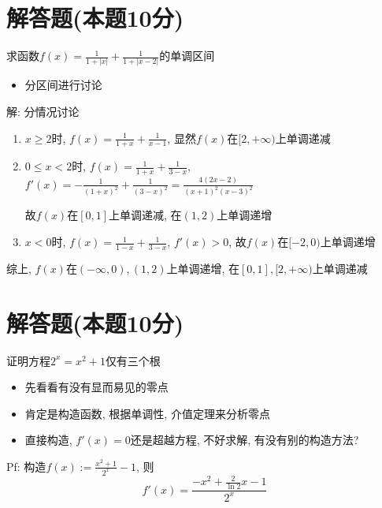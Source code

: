 \documentclass[10pt]{SelfArx} %
\numberwithin{dummy}{section}
\newenvironment{corollary}{\begin{cBox}\noindent{\bf\color{color1} 分析}}{\end{cBox}}
\begin{document}
\section[解答题]{解答题(本题10分)}
求函数$f(x)=\displaystyle\frac{1}{1+|x|}+\displaystyle\frac{1}{1+|x-2|}$的单调区间
\begin{corollary}
	\begin{itemize}
		\item 分区间进行讨论
	\end{itemize}
\end{corollary}
解: 分情况讨论
\begin{enumerate}
	\item $x\geqslant 2$时, $f(x)=\displaystyle\frac{1}{1+x}+\displaystyle\frac{1}{x-1}$, 显然$f(x)$在$[2,+\infty)$上单调递减
	\item $0\leqslant x<2$时, $f(x)=\displaystyle\frac{1}{1+x}+\displaystyle\frac{1}{3-x}$, $f'(x)=-\displaystyle\frac{1}{(1+x)^2}+\displaystyle\frac{1}{(3-x)^2}=\displaystyle\frac{4(2x-2)}{(x+1)^2(x-3)^2}$
	
	故$f(x)$在$[0,1]$上单调递减, 在$(1,2)$上单调递增
	\item $x<0$时, $f(x)=\displaystyle\frac{1}{1-x}+\displaystyle\frac{1}{3-x}$, $f'(x)>0$, 故$f(x)$在$[-2,0)$上单调递增
\end{enumerate}

综上, $f(x)$在$(-\infty,0),(1,2)$上单调递增, 在$[0,1],[2,+\infty)$上单调递减
\section[解答题]{解答题(本题10分)}
证明方程$2^x=x^2+1$仅有三个根
\begin{corollary}
	\begin{itemize}
		\item 先看看有没有显而易见的零点
		\item 肯定是构造函数, 根据单调性, 介值定理来分析零点
		\item 直接构造, $f'(x)=0$还是超越方程, 不好求解, 有没有别的构造方法?
	\end{itemize}
\end{corollary}
Pf: 构造$f(x):=\displaystyle\frac{x^2+1}{2^x}-1$, 则
\begin{displaymath}
	f'(x)=\displaystyle\frac{-x^2+\displaystyle\frac{2}{\ln 2}x-1}{2^x}
\end{displaymath}
\end{document}
